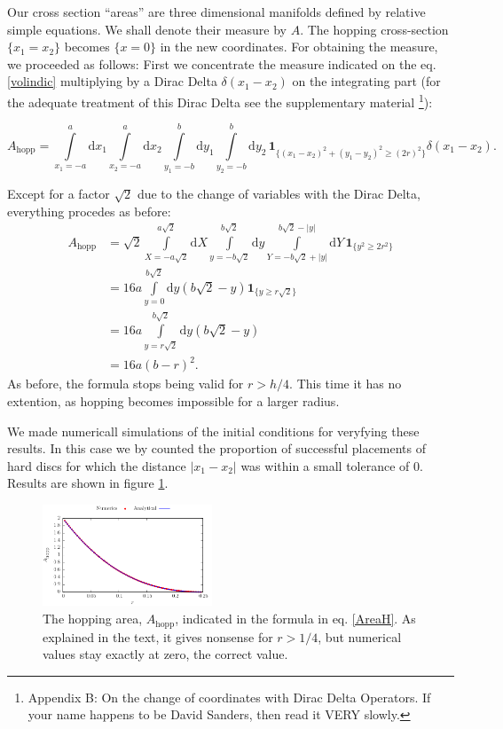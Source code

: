 \documentclass[letterpaper,10pt, jcp, aps]{revtex4-1}
\newcommand{\rd}{\!\mathrm{d}}
\newcommand{\indicator}[1]{\mathbf{1}_{ \{   #1 \} } }
\begin{document}
Our cross section ``areas'' are three dimensional manifolds
defined by relative simple equations. We shall denote their
measure by $A$.
The hopping cross-section 
$ \{x_1 = x_2\}$ becomes 
$\{ x=0 \}$ in the new coordinates.
For obtaining the measure,
we proceeded as follows:
First we concentrate the measure indicated on the eq. \ref{volindic}
multiplying by a Dirac Delta $\delta(x_1-x_2)$ on the integrating part
(for the adequate treatment of this Dirac Delta see the supplementary 
material \footnote{Appendix B: On the change of coordinates with Dirac Delta 
Operators. If your name happens to be David Sanders, then read it VERY slowly.}):
\begin{widetext}
\begin{equation}
 A_\text{hopp} = \int\limits_{x_1 = -a}^a \rd x_1 \int\limits_{x_2 = -a}^a \rd x_2 
\int\limits_{y_1 = -b}^b \rd y_1 \int\limits_{y_2 = -b}^b \rd y_2 \, \indicator{ (x_1-x_2)^2 + (y_1-y_2)^2 \ge (2r)^2 } \delta(x_1-x_2).
\end{equation}
\end{widetext}
Except for a factor $\sqrt{2}$ due to the change of variables
with the Dirac Delta, everything procedes as before:
\begin{align}
 A_\text{hopp} &= \sqrt{2} \int\limits_{X=-a \sqrt{2} }^{a \sqrt{2}}  \rd X
 \int\limits_{y=-b \sqrt{2}}^{b \sqrt{2}} \rd y
\int\limits_{Y=-b \sqrt{2} + |y| }^{b \sqrt{2}-|y|}  \rd Y
\, \indicator{y^2 \ge 2r^2 } \\
&= 16 a  \int\limits_{y=0}^{b \sqrt{2}} \rd y
\left( b \sqrt{2} - y \right)  \indicator{y \ge r \sqrt{2} }   \\
&= 16 a \int\limits_{y= r\sqrt{2}}^{b \sqrt{2}} \rd y \left( b \sqrt{2} - y \right)   \\
&= 16 a ( b - r )^2. \label{AreaH}
\end{align}
As before, the formula stops being valid for $r>h/4$. This time it has
no extention, as hopping becomes impossible for a larger radius.  

We made numericall simulations of the initial conditions for
veryfying these results. In this case we 
by counted the proportion of successful placements of hard discs 
for which the distance 
$|x_1 - x_2|$ was within a small tolerance of $0$. 
Results are shown in figure \ref{AreaHopp01}.

\begin{figure}[h]
\centering
\includegraphics[width=0.45\textwidth]{./FigurasPerfectas/AreaHop02.pdf}
\caption{The hopping area, $A_\text{hopp}$, 
  indicated in the formula in eq. \ref{AreaH}. As explained
in the text, it gives nonsense for $r>1/4$, but numerical values stay
exactly at zero, the correct value. } 
\label{AreaHopp01}
\end{figure}
\end{document}
